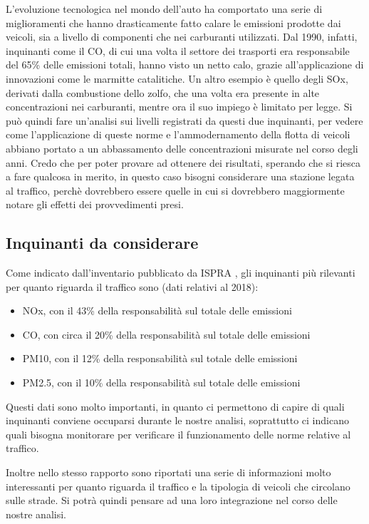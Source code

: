 \documentclass{article}
\begin{document}
L'evoluzione tecnologica nel mondo dell'auto ha comportato una serie di miglioramenti che hanno drasticamente fatto calare le emissioni prodotte dai veicoli, sia a livello di componenti che nei carburanti utilizzati. Dal 1990, infatti, inquinanti come il CO, di cui una volta il settore dei trasporti era responsabile del 65\% delle emissioni totali, hanno visto un netto calo, grazie all'applicazione di innovazioni come le marmitte catalitiche. Un altro esempio è quello degli SOx, derivati dalla combustione dello zolfo, che una volta era presente in alte concentrazioni nei carburanti, mentre ora il suo impiego è limitato per legge. Si può quindi fare un'analisi sui livelli registrati da questi due inquinanti, per vedere come l'applicazione di queste norme e l'ammodernamento della flotta di veicoli abbiano portato a un abbassamento delle concentrazioni misurate nel corso degli anni. Credo che per poter provare ad ottenere dei risultati, sperando che si riesca a fare qualcosa in merito, in questo caso bisogni considerare una stazione legata al traffico, perchè dovrebbero essere quelle in cui si dovrebbero maggiormente notare gli effetti dei provvedimenti presi.

\subsection{Inquinanti da considerare}
Come indicato dall'inventario pubblicato da ISPRA \cite{iir2020}, gli inquinanti più rilevanti per quanto riguarda il traffico sono (dati relativi al 2018): 
\begin{itemize}
	\item NOx, con il 43\% della responsabilità sul totale delle emissioni
	\item CO, con circa il 20\% della responsabilità sul totale delle emissioni
	\item PM10, con il 12\% della responsabilità sul totale delle emissioni
	\item PM2.5, con il 10\% della responsabilità sul totale delle emissioni
\end{itemize}
Questi dati sono molto importanti, in quanto ci permettono di capire di quali inquinanti conviene occuparsi durante le nostre analisi, soprattutto ci indicano quali bisogna monitorare per verificare il funzionamento delle norme relative al traffico. 

Inoltre nello stesso rapporto sono riportati una serie di informazioni molto interessanti per quanto riguarda il traffico e la tipologia di veicoli che circolano sulle strade. Si potrà quindi pensare ad una loro integrazione nel corso delle nostre analisi.
\end{document}
